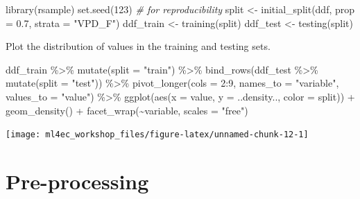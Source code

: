 \documentclass[
]{book}
\newenvironment{Shaded}{\begin{snugshade}}{\end{snugshade}}
\newcommand{\AttributeTok}[1]{\textcolor[rgb]{0.77,0.63,0.00}{#1}}
\newcommand{\CommentTok}[1]{\textcolor[rgb]{0.56,0.35,0.01}{\textit{#1}}}
\newcommand{\DecValTok}[1]{\textcolor[rgb]{0.00,0.00,0.81}{#1}}
\newcommand{\FloatTok}[1]{\textcolor[rgb]{0.00,0.00,0.81}{#1}}
\newcommand{\FunctionTok}[1]{\textcolor[rgb]{0.00,0.00,0.00}{#1}}
\newcommand{\NormalTok}[1]{#1}
\newcommand{\OtherTok}[1]{\textcolor[rgb]{0.56,0.35,0.01}{#1}}
\newcommand{\SpecialCharTok}[1]{\textcolor[rgb]{0.00,0.00,0.00}{#1}}
\newcommand{\StringTok}[1]{\textcolor[rgb]{0.31,0.60,0.02}{#1}}
\begin{document}
\begin{Shaded}
\begin{Highlighting}[]
\FunctionTok{library}\NormalTok{(rsample)}
\FunctionTok{set.seed}\NormalTok{(}\DecValTok{123}\NormalTok{)  }\CommentTok{\# for reproducibility}
\NormalTok{split }\OtherTok{\textless{}{-}} \FunctionTok{initial\_split}\NormalTok{(ddf, }\AttributeTok{prop =} \FloatTok{0.7}\NormalTok{, }\AttributeTok{strata =} \StringTok{"VPD\_F"}\NormalTok{)}
\NormalTok{ddf\_train }\OtherTok{\textless{}{-}} \FunctionTok{training}\NormalTok{(split)}
\NormalTok{ddf\_test }\OtherTok{\textless{}{-}} \FunctionTok{testing}\NormalTok{(split)}
\end{Highlighting}
\end{Shaded}

Plot the distribution of values in the training and testing sets.

\begin{Shaded}
\begin{Highlighting}[]
\NormalTok{ddf\_train }\SpecialCharTok{\%\textgreater{}\%} 
  \FunctionTok{mutate}\NormalTok{(}\AttributeTok{split =} \StringTok{"train"}\NormalTok{) }\SpecialCharTok{\%\textgreater{}\%} 
  \FunctionTok{bind\_rows}\NormalTok{(ddf\_test }\SpecialCharTok{\%\textgreater{}\%} 
    \FunctionTok{mutate}\NormalTok{(}\AttributeTok{split =} \StringTok{"test"}\NormalTok{)) }\SpecialCharTok{\%\textgreater{}\%} 
  \FunctionTok{pivot\_longer}\NormalTok{(}\AttributeTok{cols =} \DecValTok{2}\SpecialCharTok{:}\DecValTok{9}\NormalTok{, }\AttributeTok{names\_to =} \StringTok{"variable"}\NormalTok{, }\AttributeTok{values\_to =} \StringTok{"value"}\NormalTok{) }\SpecialCharTok{\%\textgreater{}\%} 
  \FunctionTok{ggplot}\NormalTok{(}\FunctionTok{aes}\NormalTok{(}\AttributeTok{x =}\NormalTok{ value, }\AttributeTok{y =}\NormalTok{ ..density.., }\AttributeTok{color =}\NormalTok{ split)) }\SpecialCharTok{+}
  \FunctionTok{geom\_density}\NormalTok{() }\SpecialCharTok{+}
  \FunctionTok{facet\_wrap}\NormalTok{(}\SpecialCharTok{\textasciitilde{}}\NormalTok{variable, }\AttributeTok{scales =} \StringTok{"free"}\NormalTok{)}
\end{Highlighting}
\end{Shaded}

\begin{center}\texttt{[image: ml4ec\_workshop\_files/figure-latex/unnamed-chunk-12-1]} \end{center}

\hypertarget{preprocessing}{%
\chapter{Pre-processing}\label{preprocessing}}
\end{document}
